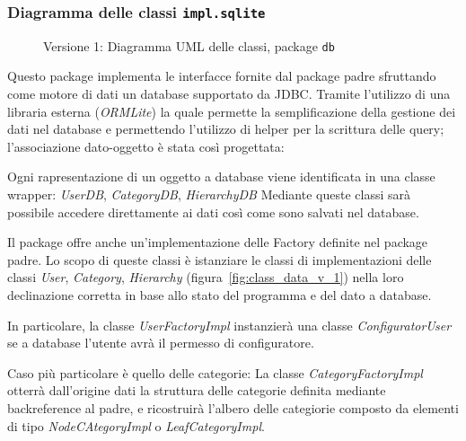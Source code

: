 \subsubsection{Diagramma delle classi \texttt{impl.sqlite}}
\vspace{0.5cm}
\begin{figure}[H]
    \centering
    \caption{Versione 1: Diagramma UML delle classi, package \texttt{db}}
    \label{fig:class_db_v_1}
\end{figure}

Questo package implementa le interfacce fornite dal package padre sfruttando come motore di dati un database supportato da JDBC.
Tramite l'utilizzo di una libraria esterna (\textit{ORMLite}) la quale permette la semplificazione della gestione dei dati nel database
e permettendo l'utilizzo di helper per la scrittura delle query; l'associazione dato-oggetto è stata così progettata:

Ogni rapresentazione di un oggetto a database viene identificata in una classe wrapper: \textit{UserDB}, \textit{CategoryDB}, \textit{HierarchyDB}
Mediante queste classi sarà possibile accedere direttamente ai dati così come sono salvati nel database.

Il package offre anche un'implementazione delle Factory definite nel package padre. Lo scopo di queste classi
è istanziare le classi di implementazioni delle classi \textit{User}, \textit{Category}, \textit{Hierarchy} (figura~\ref{fig:class_data_v_1}) 
nella loro declinazione corretta in base allo stato del programma e del dato a database.

In particolare, la classe \textit{UserFactoryImpl} instanzierà una classe \textit{ConfiguratorUser} se a database l'utente avrà
il permesso di configuratore.

Caso più particolare è quello delle categorie:
La classe \textit{CategoryFactoryImpl} otterrà dall'origine dati la struttura delle categorie definita mediante backreference al padre, 
e ricostruirà l'albero delle categiorie composto da elementi di tipo \textit{NodeCAtegoryImpl} o \textit{LeafCategoryImpl}.
